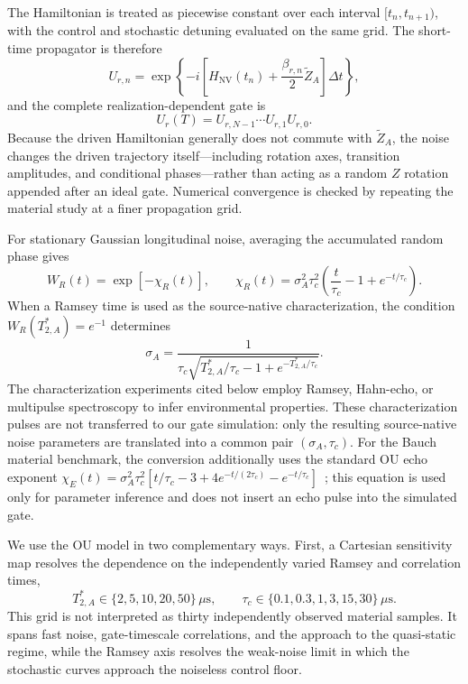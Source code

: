 \documentclass[
  aps,
  pra,
  reprint,            %
  superscriptaddress, %
  amsmath,amssymb,
  notitlepage
]{revtex4-2}
\begin{document}
The Hamiltonian is treated as piecewise constant over each interval $[t_n,t_{n+1})$, with the control and stochastic detuning evaluated on the same grid. The short-time propagator is therefore
\begin{equation}
U_{r,n}
=
\exp\!\left\{
-i\left[
H_{\mathrm{NV}}(t_n)
+
\frac{\beta_{r,n}}{2}\widetilde Z_A
\right]\Delta t
\right\},
\label{eq:noisy_timestep_propagator}
\end{equation}
and the complete realization-dependent gate is
\begin{equation}
\boxed{
U_r(T)=U_{r,N-1}\cdots U_{r,1}U_{r,0}.
}
\label{eq:noisy_ordered_product}
\end{equation}
Because the driven Hamiltonian generally does not commute with $\widetilde Z_A$, the noise changes the driven trajectory itself---including rotation axes, transition amplitudes, and conditional phases---rather than acting as a random $Z$ rotation appended after an ideal gate. Numerical convergence is checked by repeating the material study at a finer propagation grid.

For stationary Gaussian longitudinal noise, averaging the accumulated random phase gives~\cite{cywinski2008dephasing}
\begin{equation}
W_R(t)=\exp[-\chi_R(t)],
\qquad
\chi_R(t)
=
\sigma_A^2\tau_c^2
\left(
\frac{t}{\tau_c}-1+e^{-t/\tau_c}
\right).
\label{eq:ou_ramsey_envelope}
\end{equation}
When a Ramsey time is used as the source-native characterization, the condition $W_R(T_{2,A}^{\ast})=e^{-1}$ determines
\begin{equation}
\sigma_A
=
\frac{1}{
\tau_c
\sqrt{
T_{2,A}^{\ast}/\tau_c
-1
+e^{-T_{2,A}^{\ast}/\tau_c}
}
}.
\label{eq:ou_sigma_ramsey}
\end{equation}
The characterization experiments cited below employ Ramsey, Hahn-echo, or multipulse spectroscopy to infer environmental properties. These characterization pulses are not transferred to our gate simulation: only the resulting source-native noise parameters are translated into a common pair $(\sigma_A,\tau_c)$. For the Bauch material benchmark, the conversion additionally uses the standard OU echo exponent $\chi_E(t)=\sigma_A^2\tau_c^2[t/\tau_c-3+4e^{-t/(2\tau_c)}-e^{-t/\tau_c}]$~\cite{cywinski2008dephasing}; this equation is used only for parameter inference and does not insert an echo pulse into the simulated gate.

We use the OU model in two complementary ways. First, a Cartesian sensitivity map resolves the dependence on the independently varied Ramsey and correlation times,
\begin{equation}
T_{2,A}^{\ast}\in\{2,5,10,20,50\}\,\mu\mathrm{s},
\qquad
\tau_c\in\{0.1,0.3,1,3,15,30\}\,\mu\mathrm{s}.
\label{eq:ou_cartesian_grid}
\end{equation}
This grid is not interpreted as thirty independently observed material samples. It spans fast noise, gate-timescale correlations, and the approach to the quasi-static regime, while the Ramsey axis resolves the weak-noise limit in which the stochastic curves approach the noiseless control floor.
\end{document}

